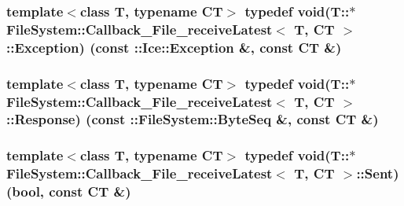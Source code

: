 \subsubsection[{Exception}]{\setlength{\rightskip}{0pt plus 5cm}template$<$class T, typename C\+T$>$ typedef void(T\+::$\ast$ {\bf File\+System\+::\+Callback\+\_\+\+File\+\_\+receive\+Latest}$<$ T, C\+T $>$\+::Exception) (const \+::Ice\+::\+Exception \&, const C\+T \&)}\label{class_file_system_1_1_callback___file__receive_latest_acc747c11c007fbee3d60c5d85affbe4e}
\hypertarget{class_file_system_1_1_callback___file__receive_latest_a5bf96c59afd76cc204ef4d42fa6527af}{}
\subsubsection[{Response}]{\setlength{\rightskip}{0pt plus 5cm}template$<$class T, typename C\+T$>$ typedef void(T\+::$\ast$ {\bf File\+System\+::\+Callback\+\_\+\+File\+\_\+receive\+Latest}$<$ T, C\+T $>$\+::Response) (const \+::{\bf File\+System\+::\+Byte\+Seq} \&, const C\+T \&)}\label{class_file_system_1_1_callback___file__receive_latest_a5bf96c59afd76cc204ef4d42fa6527af}
\hypertarget{class_file_system_1_1_callback___file__receive_latest_a3a1aaa5cad2e6bb47fd5706274b3afa3}{}
\subsubsection[{Sent}]{\setlength{\rightskip}{0pt plus 5cm}template$<$class T, typename C\+T$>$ typedef void(T\+::$\ast$ {\bf File\+System\+::\+Callback\+\_\+\+File\+\_\+receive\+Latest}$<$ T, C\+T $>$\+::Sent) (bool, const C\+T \&)}\label{class_file_system_1_1_callback___file__receive_latest_a3a1aaa5cad2e6bb47fd5706274b3afa3}
\hypertarget{class_file_system_1_1_callback___file__receive_latest_a8e2064ea01933278c4d3a63cb101d0ce}{}
